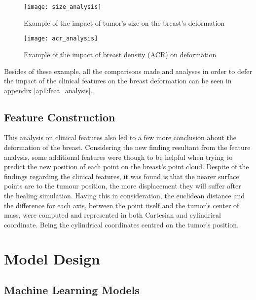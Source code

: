 \begin{figure}[!h]
\begin{center}
    \leavevmode
    \texttt{[image: size\_analysis]}
    \caption[Example of the impact of tumor's size on the breast's deformation]{Example of the impact of tumor's size on the breast's deformation}
    \label{fig:size_analysis}
  \end{center}
\end{figure}

\begin{figure}[!h]
\begin{center}
    \leavevmode
    \texttt{[image: acr\_analysis]}
    \caption[Example of the impact of breast density (ACR) on deformation]{Example of the impact of breast density (ACR) on deformation}
    \label{fig:acr_analysis}
  \end{center}
\end{figure}

Besides of these example, all the comparisons made and analyses in order to defer the impact of the clinical features on the breast deformation can be seen in appendix \ref{ap1:feat_analysis}.



\subsection{Feature Construction}

This analysis on clinical features also led to a few more conclusion about the deformation of the breast. Considering the new finding resultant from the feature analysis, some additional features were though to be helpful when trying to predict the new position of each point on the breast's point cloud. 
Despite of the findings regarding the clinical features, it was found is that the nearer surface points are to the tumour position, the more displacement they will suffer after the healing simulation. Having this in consideration, the euclidean distance and the difference for each axis, between the point itself and the tumor's center of mass, were computed and represented in both Cartesian and cylindrical coordinate. Being the cylindrical coordinates centred on the tumor's position.


\section{Model Design}

\subsection{Machine Learning Models}

